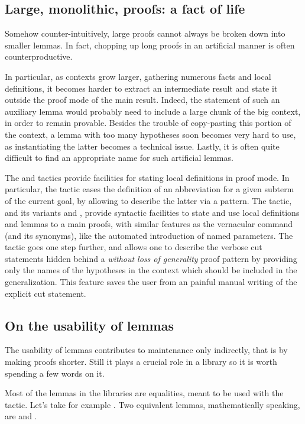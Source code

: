 \subsection{Large, monolithic, proofs: a fact of life}

Somehow counter-intuitively, large proofs cannot always be broken down
into smaller lemmas. In fact, chopping up long proofs in an
artificial manner is often counterproductive.

In particular, as contexts grow larger, gathering numerous facts and
local definitions, it becomes harder to extract an intermediate result
and state it outside the proof mode of the main result. Indeed, the
statement of such an auxiliary lemma would probably need to include a
large chunk of the big context, in order to remain provable. Besides
the trouble of copy-pasting this portion of the context, a lemma with
too many hypotheses soon becomes very hard to use, as instantiating
the latter becomes a technical issue. Lastly, it is often quite
difficult to find an appropriate name for such artificial lemmas.

The  and  tactics provide facilities for stating local
definitions in proof mode. In particular, the  tactic eases the
definition of an abbreviation for a given subterm of the current goal,
by allowing to describe the latter via a pattern. 
The  tactic, and its variants  and ,
provide syntactic facilities to state and use local definitions and
lemmas to a main proofs, with similar features as the 
vernacular command (and its synonyms), like the automated introduction
of named parameters. The  tactic goes one step further, and
allows one to describe the verbose cut statements hidden behind a
\emph{without loss of generality} proof pattern by providing only the
names of the hypotheses in the context which should be included in the
generalization. This feature saves the user from an painful manual
writing of the explicit cut statement.

\subsection{On the usability of lemmas}

The usability of lemmas contributes to maintenance only indirectly,
that is by making proofs shorter. Still it plays a crucial role
in a library so it is worth spending a few words on it.

Most of the lemmas in the \mcbMC{} libraries are equalities, meant to be
used with the  tactic. Let's take for example . Two equivalent lemmas, mathematically speaking, are
and 
.

